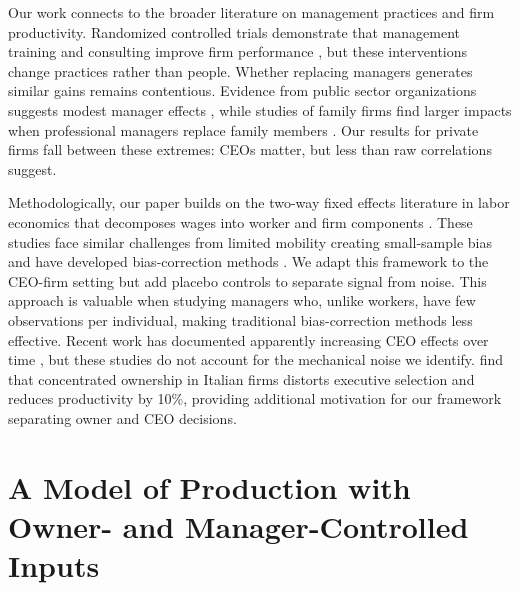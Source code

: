 \documentclass[11pt,a4paper]{article}
\begin{document}
Our work connects to the broader literature on management practices and firm productivity. Randomized controlled trials demonstrate that management training and consulting improve firm performance \citep{bloom2013does}, but these interventions change practices rather than people. Whether replacing managers generates similar gains remains contentious. Evidence from public sector organizations suggests modest manager effects \citep{fenizia2022managers, janke2024role}, while studies of family firms find larger impacts when professional managers replace family members \citep{bennedsen2007inside}. Our results for private firms fall between these extremes: CEOs matter, but less than raw correlations suggest.

Methodologically, our paper builds on the two-way fixed effects literature in labor economics that decomposes wages into worker and firm components \citep{Abowd1999Econometrica, Card2018JoLE}. These studies face similar challenges from limited mobility creating small-sample bias \citep{andrews2008high} and have developed bias-correction methods \citep{Bonhomme2023-dx, gaure2014correlation}. We adapt this framework to the CEO-firm setting but add placebo controls to separate signal from noise. This approach is valuable when studying managers who, unlike workers, have few observations per individual, making traditional bias-correction methods less effective. Recent work has documented apparently increasing CEO effects over time \citep{quigley2015has}, but these studies do not account for the mechanical noise we identify. \citet{lippi2014corporate} find that concentrated ownership in Italian firms distorts executive selection and reduces productivity by 10\%, providing additional motivation for our framework separating owner and CEO decisions.

\section{A Model of Production with Owner- and Manager-Controlled Inputs}
\end{document}
